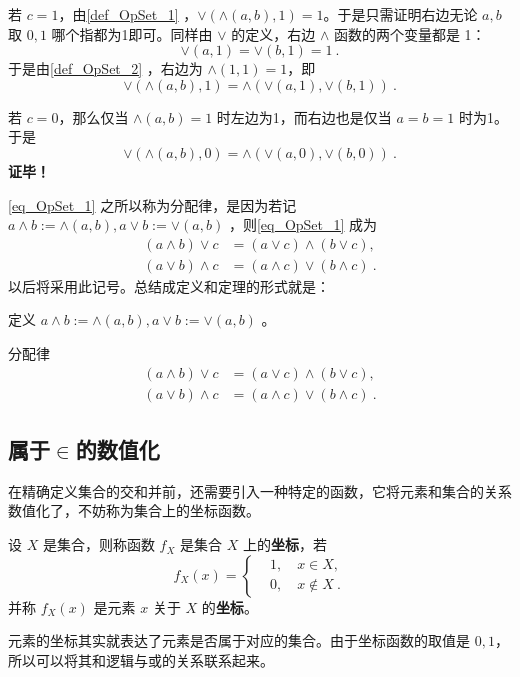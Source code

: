 若 $c=1$，由\autoref{def_OpSet_1} ，$\lor(\land(a,b),1)=1$。于是只需证明右边无论 $a,b$ 取 $0,1$ 哪个指都为1即可。同样由 $\lor$ 的定义，右边 $\land$ 函数的两个变量都是 1：
\begin{equation}
\lor(a,1)=\lor(b,1)=1~.
\end{equation}
于是由\autoref{def_OpSet_2} ，右边为 $\land(1,1)=1$，即
\begin{equation}
\lor(\land(a,b),1)=\land(\lor(a,1),\lor(b,1))~.
\end{equation}

若 $c=0$，那么仅当 $\land(a,b)=1$ 时左边为1，而右边也是仅当 $a=b=1$ 时为1。于是
\begin{equation}
\lor(\land(a,b),0)=\land(\lor(a,0),\lor(b,0))~.
\end{equation}
\textbf{证毕！}

\autoref{eq_OpSet_1} 之所以称为分配律，是因为若记 $a\land b:=\land(a,b),a\lor b:=\lor(a,b)$ ，则\autoref{eq_OpSet_1} 成为
\begin{equation}
\begin{aligned}
(a\land b)\lor c&=(a\lor c)\land(b\lor c),\\
(a\lor b)\land c&=(a\land c)\lor(b\land c)~.
\end{aligned}
\end{equation}
以后将采用此记号。总结成定义和定理的形式就是：
\begin{definition}{}
定义 $a\land b:=\land(a,b),a\lor b:=\lor(a,b)$ 。
\end{definition}
\begin{theorem}{分配律}\label{the_OpSet_2}
\begin{equation}
\begin{aligned}
(a\land b)\lor c&=(a\lor c)\land(b\lor c),\\
(a\lor b)\land c&=(a\land c)\lor(b\land c)~.
\end{aligned}
\end{equation}
\end{theorem}
\subsection{属于$\in$的数值化}
在精确定义集合的交和并前，还需要引入一种特定的函数，它将元素和集合的关系数值化了，不妨称为集合上的坐标函数。
\begin{definition}{}\label{def_OpSet_6}
设 $X$ 是集合，则称函数 $f_X$ 是集合 $X$ 上的\textbf{坐标}，若
\begin{equation}\label{eq_OpSet_3}
f_X(x)=\left\{\begin{aligned}
&1,\quad x\in X,\\
&0,\quad x\notin X~.
\end{aligned}\right.
\end{equation}
并称 $f_X(x)$ 是元素 $x$ 关于 $X$ 的\textbf{坐标}。
\end{definition}
元素的坐标其实就表达了元素是否属于对应的集合。由于坐标函数的取值是 $0,1$，所以可以将其和逻辑与或的关系联系起来。

